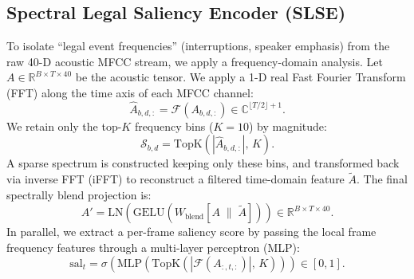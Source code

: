 \documentclass[letterpaper]{article} %
\begin{document}
\subsection{Spectral Legal Saliency Encoder (SLSE)}
To isolate ``legal event frequencies'' (interruptions, speaker emphasis) from the raw 40-D acoustic MFCC stream, we apply a frequency-domain analysis. Let $A \in \mathbb{R}^{B \times T \times 40}$ be the acoustic tensor.
We apply a 1-D real Fast Fourier Transform (FFT) along the time axis of each MFCC channel:
\begin{equation}
    \hat{A}_{b,d,:} = \mathcal{F}\left(A_{b,d,:}\right) \in \mathbb{C}^{\lfloor T/2 \rfloor + 1}.
\end{equation}
We retain only the top-$K$ frequency bins ($K=10$) by magnitude:
\begin{equation}
    \mathcal{S}_{b,d} = \text{TopK}\left(\left|\hat{A}_{b,d,:}\right|,\, K\right).
\end{equation}
A sparse spectrum is constructed keeping only these bins, and transformed back via inverse FFT (iFFT) to reconstruct a filtered time-domain feature $\tilde{A}$. The final spectrally blend projection is:
\begin{equation}
    A' = \text{LN}\left(\text{GELU}\left(W_{\text{blend}}[A \;\|\; \tilde{A}]\right)\right) \in \mathbb{R}^{B \times T \times 40}.
\end{equation}
In parallel, we extract a per-frame saliency score by passing the local frame frequency features through a multi-layer perceptron (MLP):
\begin{equation}
    \text{sal}_t = \sigma\left(\text{MLP}\left(\text{TopK}\left(\left|\mathcal{F}(A_{:,t,:})\right|,\, K\right)\right)\right) \in [0, 1].
\end{equation}
\end{document}
